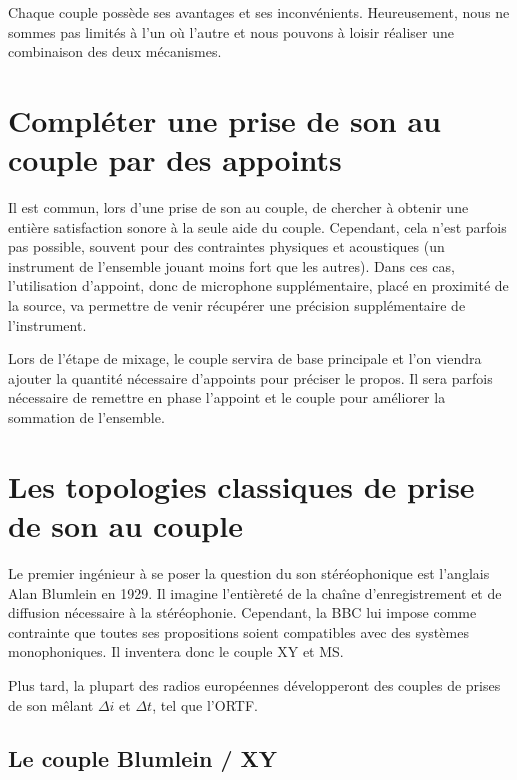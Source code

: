 \documentclass[
]{book}
\begin{document}
Chaque couple possède ses avantages et ses inconvénients. Heureusement, nous ne sommes pas limités à l'un où l'autre et nous pouvons à loisir réaliser une combinaison des deux mécanismes.

\hypertarget{compluxe9ter-une-prise-de-son-au-couple-par-des-appoints}{%
\section{Compléter une prise de son au couple par des appoints}\label{compluxe9ter-une-prise-de-son-au-couple-par-des-appoints}}

Il est commun, lors d'une prise de son au couple, de chercher à obtenir une entière satisfaction sonore à la seule aide du couple. Cependant, cela n'est parfois pas possible, souvent pour des contraintes physiques et acoustiques (un instrument de l'ensemble jouant moins fort que les autres). Dans ces cas, l'utilisation d'appoint, donc de microphone supplémentaire, placé en proximité de la source, va permettre de venir récupérer une précision supplémentaire de l'instrument.

Lors de l'étape de mixage, le couple servira de base principale et l'on viendra ajouter la quantité nécessaire d'appoints pour préciser le propos. Il sera parfois nécessaire de remettre en phase l'appoint et le couple pour améliorer la sommation de l'ensemble.

\hypertarget{les-topologies-classiques-de-prise-de-son-au-couple}{%
\section{Les topologies classiques de prise de son au couple}\label{les-topologies-classiques-de-prise-de-son-au-couple}}

Le premier ingénieur à se poser la question du son stéréophonique est l'anglais Alan Blumlein en 1929. Il imagine l'entièreté de la chaîne d'enregistrement et de diffusion nécessaire à la stéréophonie. Cependant, la BBC lui impose comme contrainte que toutes ses propositions soient compatibles avec des systèmes monophoniques. Il inventera donc le couple XY et MS.

Plus tard, la plupart des radios européennes développeront des couples de prises de son mêlant \(\Delta i\) et \(\Delta t\), tel que l'ORTF.

\hypertarget{le-couple-blumlein-xy}{%
\subsection{Le couple Blumlein / XY}\label{le-couple-blumlein-xy}}
\end{document}
